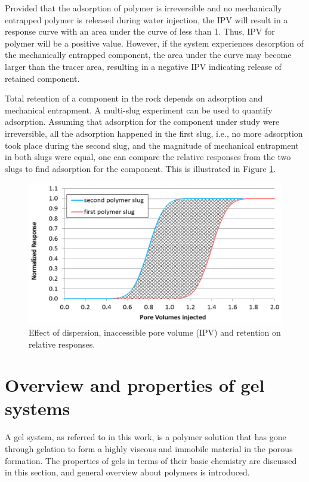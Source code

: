 Provided that the adsorption of polymer is irreversible and no mechanically entrapped polymer is released during water injection, the IPV will result in a response curve with an area under the curve of less than 1. Thus, IPV for polymer will be a positive value. However, if the system experiences desorption of the mechanically entrapped component, the area under the curve may become larger than the tracer area, resulting in a negative IPV indicating release of retained component. 

Total retention of a component in the rock depends on adsorption and mechanical entrapment. A multi-slug experiment can be used to quantify adsorption. Assuming that adsorption for the component under study were irreversible, all the adsorption happened in the first slug, i.e., no more adsorption took place during the second slug, and the magnitude of mechanical entrapment in both slugs were equal, one can compare the relative responses from the two slugs to find adsorption for the component. This is illustrated in Figure \ref{fig:ipvRet3}.

\begin{figure}[h!]
    \centering
    \includegraphics[width=\textwidth]{img/fig/ipvRet3.png}
    \caption{Effect of dispersion, inaccessible pore volume (IPV) and retention on relative responses.}
    \label{fig:ipvRet3} %
\end{figure}


\section{Overview and properties of gel systems}

A  gel system, as referred to in this work, is a polymer solution that has gone through gelation to form a highly viscous and immobile material in the porous formation. The properties of gels in terms of their basic chemistry are discussed in this section, and general overview about polymers is introduced.


